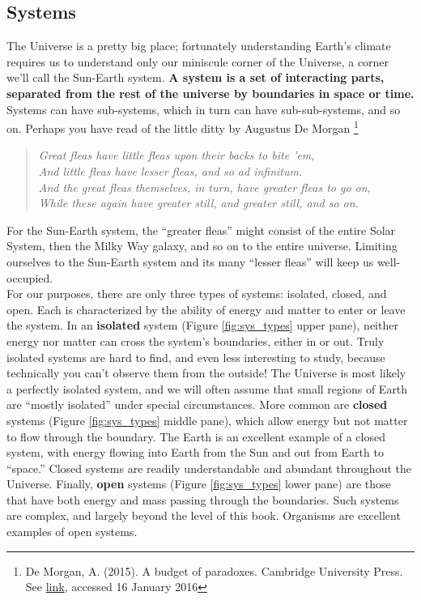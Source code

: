 \subsection{Systems}
The Universe is a pretty big place; fortunately understanding Earth's climate requires us to understand only our miniscule corner of the Universe, a corner we'll call the Sun-Earth system. \textbf{A system is a set of interacting parts, separated from the rest of the universe by boundaries in space or time.} Systems can have sub-systems, which in turn can have sub-sub-systems, and so on. Perhaps you have read of the little ditty by Augustus De Morgan \footnote{De Morgan, A. (2015). A budget of paradoxes. Cambridge University Press. See \href{http://articles.latimes.com/1987-03-25/news/vw-191_1_fleast}{link}, accessed 16 January 2016}
\begin{quotation}\noindent\textit{Great fleas have little fleas upon their backs to bite 'em,\\
	And little fleas have lesser fleas, and so ad infinitum.\\
	And the great fleas themselves, in turn, have greater fleas to go on,\\
	While these again have greater still, and greater still, and so on.}
\end{quotation}
For the Sun-Earth system, the ``greater fleas'' might consist of the entire Solar System, then the Milky Way galaxy, and so on to the entire universe. Limiting ourselves to the Sun-Earth system and its many ``lesser fleas'' will keep us well-occupied.\\ 
For our purposes, there are only three types of systems: isolated, closed, and open. Each is characterized by the ability of energy and matter to enter or leave the system. In an \textbf{isolated} system (Figure \ref{fig:sys_types} upper pane), neither energy nor matter can cross the system's boundaries, either in or out. Truly isolated systems are hard to find, and even less interesting to study, because technically you can't observe them from the outside! The Universe is most likely a perfectly isolated system, and we will often assume that small regions of Earth are ``mostly isolated'' under special circumstances. More common are \textbf{closed} systems (Figure \ref{fig:sys_types} middle pane), which allow energy but not matter to flow through the boundary. The Earth is an excellent example of a closed system, with energy flowing into Earth from the Sun and out from Earth to ``space.'' Closed systems are readily understandable and abundant throughout the Universe. Finally, \textbf{open} systems (Figure \ref{fig:sys_types} lower pane) are those that have both energy and mass passing through the boundaries. Such systems are complex, and largely beyond the level of this book. Organisms are excellent examples of open systems.\\

